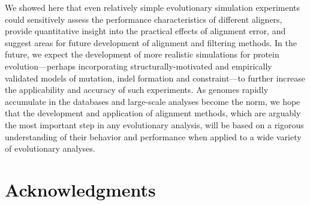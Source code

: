\documentclass{mbe}
\begin{document}
We showed here that even relatively simple evolutionary simulation
experiments could sensitively assess the performance characteristics
of different aligners, provide quantitative insight into the practical
effects of alignment error, and suggest areas for future development
of alignment and filtering methods. In the future, we expect the
development of more realistic simulations for protein
evolution---perhaps incorporating structurally-motivated and
empirically validated models of mutation, indel formation and
constraint---to further increase the applicability and accuracy of
such experiments. As genomes rapidly accumulate in the databases and
large-scale analyses become the norm, we hope that the development and
application of alignment methods, which are arguably the most
important step in any evolutionary analysis, will be based on a
rigorous understanding of their behavior and performance when applied
to a wide variety of evolutionary analyses.

\section*{Acknowledgments}

 \fontsize{9}{10}\selectfont%


\end{document}
